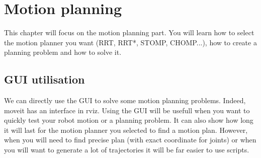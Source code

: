 \chapter{Motion planning}

This chapter will focus on the motion planning part. You will learn how to select the motion planner you want (RRT, RRT*, STOMP, CHOMP...), how to create a planning problem and how to solve it.

\section{GUI utilisation}

We can directly use the GUI to solve some motion planning problems. Indeed, moveit has an interface in rviz. Using the GUI will be usefull when you want to quickly test your robot motion or a planning problem. It can also show how long it will last for the motion planner you selected to find a motion plan. However, when you will need to find precise plan (with exact coordinate for joints) or when you will want to generate a lot of trajectories it will be far easier to use scripts.

